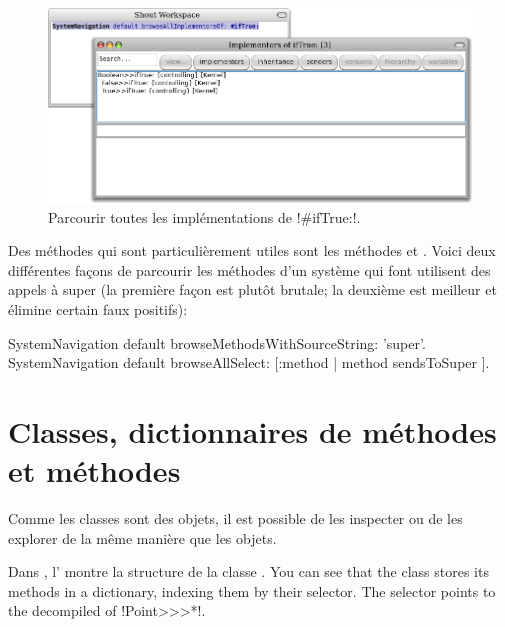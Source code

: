 \documentclass[a4paper,10pt,twoside]{book}
\begin{document}
\begin{figure}[ht]\centering
	\includegraphics[width=\linewidth]{implementors}
	\caption{Parcourir toutes les implémentations de \ct!\#ifTrue:!.}
\end{figure}

Des méthodes qui sont particulièrement utiles sont les méthodes  et . 
Voici deux différentes façons de parcourir les méthodes d'un système qui font utilisent des appels à super (la première façon est plutôt brutale; la deuxième est meilleur et élimine certain faux positifs):
\begin{code}{}
SystemNavigation default browseMethodsWithSourceString: 'super'.
SystemNavigation default browseAllSelect: [:method | method sendsToSuper ].
\end{code}

\section{Classes, dictionnaires de méthodes et méthodes}

Comme les classes sont des objets, il est possible de les inspecter ou de les explorer de la même manière que les objets.


Dans , l'  montre la structure de la classe .
You can see that the class stores its methods in a dictionary, indexing them by their selector.
The selector \ct{#*} points to the decompiled  of \ct!Point>>>*!.
\end{document}
